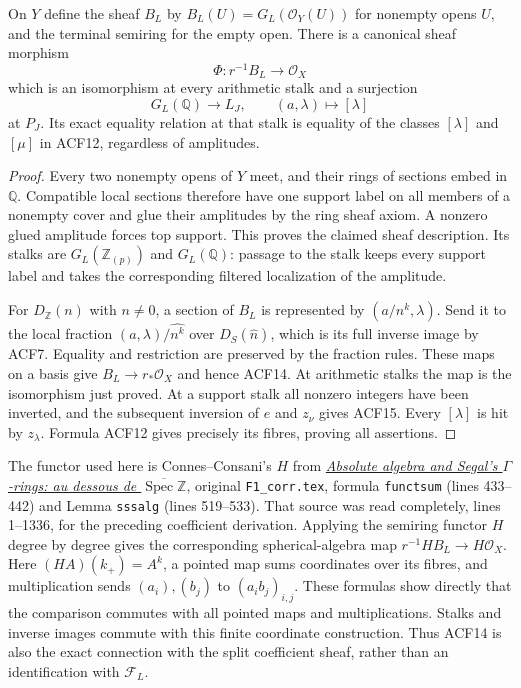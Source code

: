 \begin{proposition}
On $Y$ define the sheaf $B_L$ by
$B_L(U)=G_L(\mathcal O_Y(U))$ for nonempty opens $U$, and the terminal
semiring for the empty open. There is a canonical sheaf morphism
\begin{equation}\tag{ACF14}
 \Phi:r^{-1}B_L\longrightarrow\mathcal O_X
\end{equation}
which is an isomorphism at every arithmetic stalk and a surjection
\begin{equation}\tag{ACF15}
 G_L(\mathbb Q)\longrightarrow L_J,\qquad
 (a,\lambda)\longmapsto[\lambda]
\end{equation}
at $P_J$. Its exact equality relation at that stalk is equality of the
classes $[\lambda]$ and $[\mu]$ in ACF12, regardless of amplitudes.
\end{proposition}
\begin{proof}
Every two nonempty opens of $Y$ meet, and their rings of sections embed
in $\mathbb Q$. Compatible local sections therefore have one support
label on all members of a nonempty cover and glue their amplitudes by
the ring sheaf axiom. A nonzero glued amplitude forces top support.
This proves the claimed sheaf description. Its stalks are
$G_L(\mathbb Z_{(p)})$ and $G_L(\mathbb Q)$: passage to the stalk keeps
every support label and takes the corresponding filtered localization
of the amplitude.

For $D_{\mathbb Z}(n)$ with $n\ne0$, a section of $B_L$ is represented
by $(a/n^k,\lambda)$. Send it to the local fraction
$(a,\lambda)/\widehat{n^k}$ over $D_S(\widehat n)$, which is its full
inverse image by ACF7. Equality and restriction are preserved by the
fraction rules. These maps on a basis give $B_L\to r_*\mathcal O_X$
and hence ACF14. At arithmetic stalks the map is the isomorphism just
proved. At a support stalk all nonzero integers have been inverted,
and the subsequent inversion of $e$ and $z_\nu$ gives ACF15. Every
$[\lambda]$ is hit by $z_\lambda$. Formula ACF12 gives precisely its
fibres, proving all assertions.
\end{proof}
The functor used here is Connes--Consani's $H$ from
\href{https://arxiv.org/abs/1502.05585}{\emph{Absolute algebra and
Segal's $\Gamma$-rings: au dessous de $\overline{\operatorname{Spec}
\mathbb Z}$}}, original \nolinkurl{F1_corr.tex}, formula
\texttt{functsum} (lines 433--442) and Lemma \texttt{sssalg}
(lines 519--533). That source was read completely, lines 1--1336,
for the preceding coefficient derivation.
Applying the semiring functor $H$ degree by degree gives the corresponding
spherical-algebra map $r^{-1}HB_L\to H\mathcal O_X$. Here
$(HA)(k_+)=A^k$, a pointed map sums coordinates over its fibres, and
multiplication sends $(a_i),(b_j)$ to $(a_i b_j)_{i,j}$. These formulas
show directly that the comparison commutes with all pointed maps and
multiplications. Stalks and inverse images commute with this finite
coordinate construction. Thus ACF14 is also the exact connection with
the split coefficient sheaf, rather than an identification with
$\mathcal F_L$.

